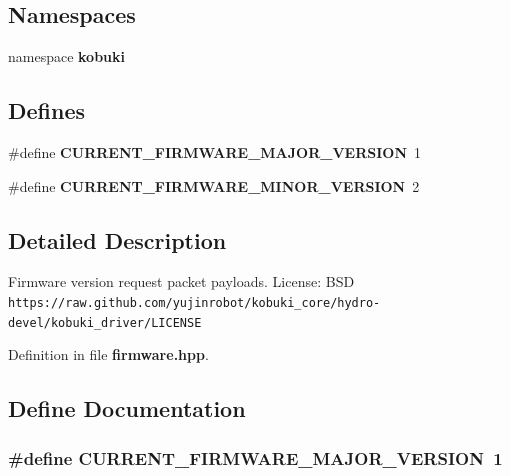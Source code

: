 \subsection*{\-Namespaces}
\begin{DoxyCompactItemize}
\item 
namespace {\bf kobuki}
\end{DoxyCompactItemize}
\subsection*{\-Defines}
\begin{DoxyCompactItemize}
\item 
\#define {\bf \-C\-U\-R\-R\-E\-N\-T\-\_\-\-F\-I\-R\-M\-W\-A\-R\-E\-\_\-\-M\-A\-J\-O\-R\-\_\-\-V\-E\-R\-S\-I\-O\-N}~1
\item 
\#define {\bf \-C\-U\-R\-R\-E\-N\-T\-\_\-\-F\-I\-R\-M\-W\-A\-R\-E\-\_\-\-M\-I\-N\-O\-R\-\_\-\-V\-E\-R\-S\-I\-O\-N}~2
\end{DoxyCompactItemize}


\subsection{\-Detailed \-Description}
\-Firmware version request packet payloads. \-License\-: \-B\-S\-D {\tt https\-://raw.\-github.\-com/yujinrobot/kobuki\-\_\-core/hydro-\/devel/kobuki\-\_\-driver/\-L\-I\-C\-E\-N\-S\-E} 

\-Definition in file {\bf firmware.\-hpp}.



\subsection{\-Define \-Documentation}
\subsubsection[{\-C\-U\-R\-R\-E\-N\-T\-\_\-\-F\-I\-R\-M\-W\-A\-R\-E\-\_\-\-M\-A\-J\-O\-R\-\_\-\-V\-E\-R\-S\-I\-O\-N}]{\setlength{\rightskip}{0pt plus 5cm}\#define {\bf \-C\-U\-R\-R\-E\-N\-T\-\_\-\-F\-I\-R\-M\-W\-A\-R\-E\-\_\-\-M\-A\-J\-O\-R\-\_\-\-V\-E\-R\-S\-I\-O\-N}~1}\label{firmware_8hpp_a161d3871c6e5e161eb3065ca8d8e5669}


